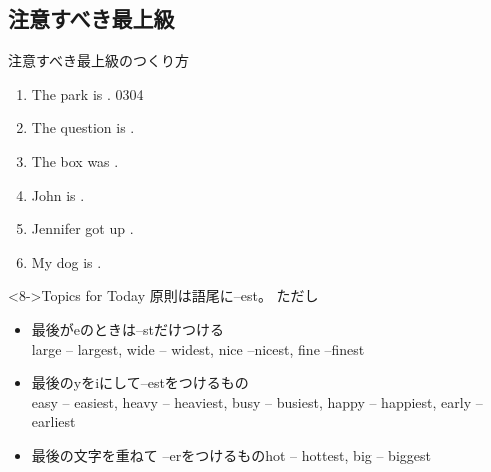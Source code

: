 \documentclass[aspectratio=169,xcolor={dvipsnames,table}]{beamer}
\begin{document}
\subsection{注意すべき最上級}
\begin{frame}[plain]{注意すべき最上級のつくり方}
 \begin{enumerate}
  \item<1-> The park is  .%
\hfill{\tiny 0304}\,{\scriptsize {}}
  \item<1-> The question is  .
  \item<1-> The box was  .
  \item<1-> John is  .
  \item<1-> Jennifer got up  .
  \item<1-> My dog is  .
 \end{enumerate}

\begin{block}<8->{Topics for Today}
{\small 原則は語尾に--est。
ただし}
\begin{itemize}[square]\small
 \item 最後がeのときは--stだけつける\\\hfill{}large -- largest, wide -- widest, nice --nicest, fine --finest　
 \item 最後のyをiにして--estをつけるもの\\\hfill{}easy -- easiest, heavy -- heaviest, busy -- busiest, happy -- happiest, early -- earliest　
 \item 最後の文字を重ねて --erをつけるもの\hfill{}hot -- hottest, big -- biggest　

 \end{itemize}
     \end{block}
\end{frame}
\end{document}
